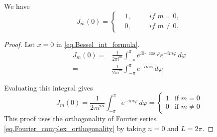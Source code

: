 \begin{lemma}[] We have
\begin{equation}\label{eq.Bessel_value_at_zero}
    J_m(0) = \left\{\begin{aligned}
    &1,\quad &&\textit{if } m = 0,
    \\
    &0, &&\textit{if } m \neq 0.
\end{aligned}
\right.
\end{equation}
\end{lemma}
\begin{proof}
Let $x = 0$ in \eqref{eq.Bessel_int_formula}. 
\begin{equation}\label{eq.proof_Bessel_value_at_zero_1}
    \begin{split}
    J_m(0) =& \frac{1}{2\pi i^m} \int_{-\pi}^{\pi} e^{i0 \cdot \cos \varphi} e^{-im \varphi} \, d\varphi
    \\
    =& \frac{1}{2\pi i^m} \int_{-\pi}^{\pi} e^{-im \varphi} \, d\varphi
    \end{split}
\end{equation}

Evaluating this integral gives
\begin{equation}\label{eq.proof_Bessel_value_at_zero_2}
    J_m(0)=\frac{1}{2\pi i^m} \int_{-\pi}^{\pi} e^{-im \varphi} \, d\varphi= 
    \begin{cases} 
    1 & \text{if } m = 0 \\ 
    0 & \text{if } m \neq 0 
    \end{cases}
\end{equation}
This proof uses the orthogonality of Fourier series \eqref{eq.Fourier_complex_orthogonality} by taking $n = 0$ and $L = 2\pi$.
\end{proof}

